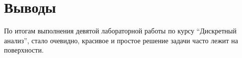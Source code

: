 \section{Выводы}

По итогам выполнения девятой лабораторной работы по курсу \enquote{Дискретный анализ}, стало очевидно, красивое и простое решение задачи часто лежит на поверхности.

\pagebreak
